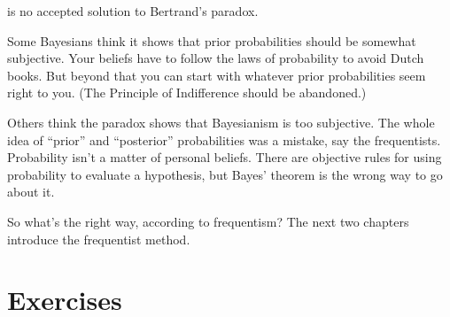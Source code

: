 \documentclass[justified]{tufte-book}
\theoremstyle{definition}
\theoremstyle{definition}
\theoremstyle{definition}
\theoremstyle{remark}
\begin{document}
 is no accepted solution to Bertrand's paradox.

Some Bayesians think it shows that prior probabilities should be
somewhat subjective. Your beliefs have to follow the laws of probability
to avoid Dutch books. But beyond that you can start with whatever prior
probabilities seem right to you. (The Principle of Indifference should
be abandoned.)

Others think the paradox shows that Bayesianism is too subjective. The
whole idea of ``prior'' and ``posterior'' probabilities was a mistake,
say the frequentists. Probability isn't a matter of personal beliefs.
There are objective rules for using probability to evaluate a
hypothesis, but Bayes' theorem is the wrong way to go about it.

So what's the right way, according to frequentism? The next two chapters
introduce the frequentist method.

\hypertarget{exercises-14}{%
\section*{Exercises}\label{exercises-14}}
\end{document}
